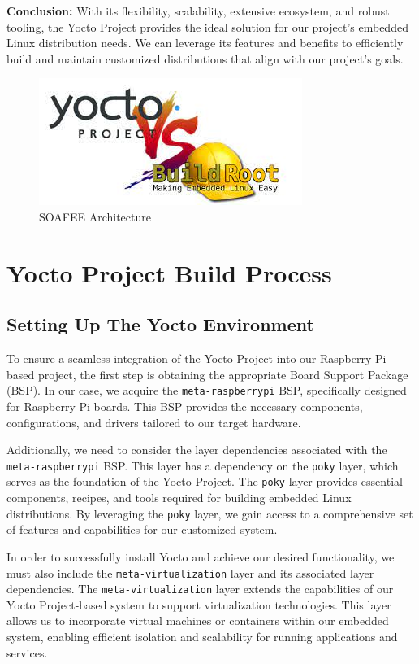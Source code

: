 \documentclass[
12pt,
oneside, 
onehalfspacing, 
nolistspacing, 
parskip, 
chapterinoneline, 
]{AASTCOMPUTER}
\begin{document}
\textbf{Conclusion:} With its flexibility, scalability, extensive ecosystem, and robust tooling, the Yocto Project provides the ideal solution for our project's embedded Linux distribution needs. We can leverage its features and benefits to efficiently build and maintain customized distributions that align with our project's goals.
\begin{figure}[!ht]
\centering
\includegraphics[scale=0.4]{Figures/16.png}
\caption[SOAFEE Architecture]{SOAFEE Architecture}
\label{fig:TCU}
\end{figure}

\section{Yocto Project Build Process}
\subsection{Setting Up The Yocto Environment}
To ensure a seamless integration of the Yocto Project into our Raspberry Pi-based project, the first step is obtaining the appropriate Board Support Package (BSP). In our case, we acquire the \texttt{meta-raspberrypi} BSP, specifically designed for Raspberry Pi boards. This BSP provides the necessary components, configurations, and drivers tailored to our target hardware.

Additionally, we need to consider the layer dependencies associated with the \texttt{meta-raspberrypi} BSP. This layer has a dependency on the \texttt{poky} layer, which serves as the foundation of the Yocto Project. The \texttt{poky} layer provides essential components, recipes, and tools required for building embedded Linux distributions. By leveraging the \texttt{poky} layer, we gain access to a comprehensive set of features and capabilities for our customized system.

In order to successfully install Yocto and achieve our desired functionality, we must also include the \texttt{meta-virtualization} layer and its associated layer dependencies. The \texttt{meta-virtualization} layer extends the capabilities of our Yocto Project-based system to support virtualization technologies. This layer allows us to incorporate virtual machines or containers within our embedded system, enabling efficient isolation and scalability for running applications and services.
\end{document}
